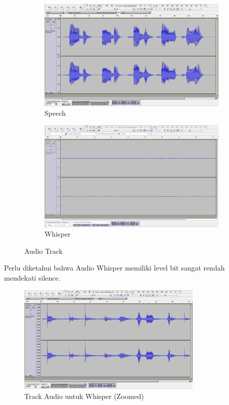 \documentclass[12pt,]{article}
\begin{document}
	\begin{figure}[!ht]
		\centering
		\begin{subfigure}[b]{0.49\textwidth}
			\includegraphics[width=\textwidth]{images/elitech_testAudioSpeech}
			\caption{Speech}
		\end{subfigure}
		\begin{subfigure}[b]{0.49\textwidth}
			\includegraphics[width=\textwidth]{images/elitech_testAudioWhisperOri}
			\caption{Whisper}
		\end{subfigure}
		\caption{Audio Track}
	\end{figure}

	\newpage
	Perlu diketahui bahwa Audio Whisper memiliki level bit sangat rendah mendekati silence.
	
	\begin{figure}[!ht]
		\centering
		\includegraphics[width=250pt]{images/elitech_testAudioWhisper}
		\caption{Track Audio untuk Whisper (Zoomed)}
	\end{figure}
	
\end{document}
